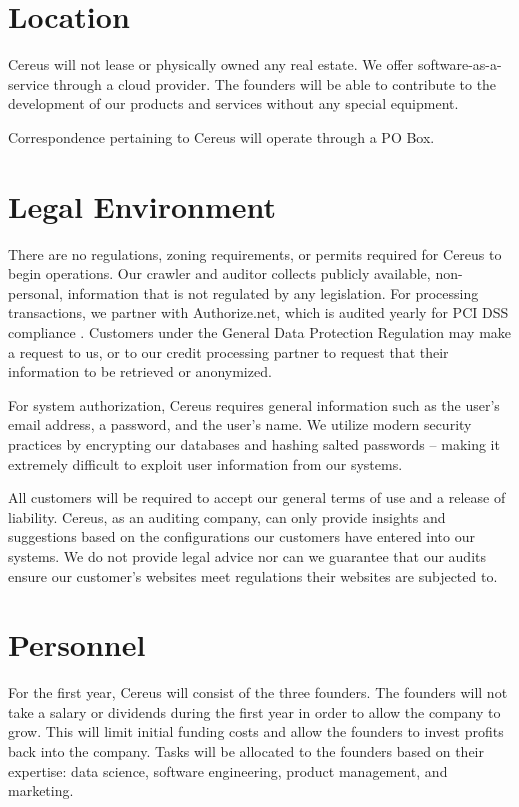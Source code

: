 \section{Location}

Cereus will not lease or physically owned any real estate. We offer software-as-a-service through a cloud provider. The founders will be able to contribute to the development of our products and services without any special equipment. 

Correspondence pertaining to Cereus will operate through a PO Box. 

\section{Legal Environment}

There are no regulations, zoning requirements, or permits required for Cereus to begin operations. Our crawler and auditor collects publicly available, non-personal, information that is not regulated by any legislation. For processing transactions, we partner with Authorize.net, which is audited yearly for PCI DSS compliance \cite{authnet.2020}. Customers under the General Data Protection Regulation may make a request to us, or to our credit processing partner to request that their information to be retrieved or anonymized.

For system authorization, Cereus requires general information such as the user's email address, a password, and the user's name. We utilize modern security practices by encrypting our databases and hashing salted passwords -- making it extremely difficult to exploit user information from our systems.

All customers will be required to accept our general terms of use and a release of liability. Cereus, as an auditing company, can only provide insights and suggestions based on the configurations our customers have entered into our systems. We do not provide legal advice nor can we guarantee that our audits ensure our customer's websites meet regulations their websites are subjected to.

\section{Personnel}

For the first year, Cereus will consist of the three founders. The founders will not take a salary or dividends during the first year in order to allow the company to grow. This will limit initial funding costs and allow the founders to invest profits back into the company. Tasks will be allocated to the founders based on their expertise: data science, software engineering, product management, and marketing.

